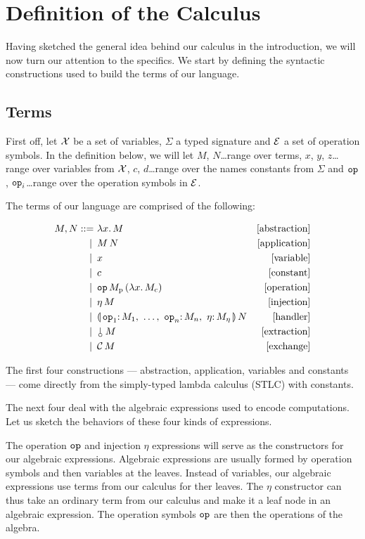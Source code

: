 \documentclass{llncs}
\begin{document}
\section{Definition of the Calculus}
\label{sec:definition}

Having sketched the general idea behind our calculus in the introduction,
we will now turn our attention to the specifics. We start by defining the
syntactic constructions used to build the terms of our language.

\subsection{Terms}
\label{ssec:terms}

First off, let $\mathcal{X}$ be a set of variables, $\Sigma$ a typed signature and
$\mathcal{E}$ a set of operation symbols. In the definition below, we will let $M$,
$N$\ldots range over terms, $x$, $y$, $z$\ldots range over variables from
$\mathcal{X}$, $c$, $d$\ldots range over the names constants from $\Sigma$ and
$\mathtt{op}$, $\mathtt{op}_i$\ldots range over the operation symbols in $\mathcal{E}$.

The terms of our language are comprised of the following:

\begin{align*}
  M, N ::= &\ \lam{x}{M} & \mbox{[abstraction]} \\
   | \, &\ \ap{M}{N} & \mbox{[application]} \\
   | \, &\ x & \mbox{[variable]} \\
   | \, &\ c & \mbox{[constant]} \\
   | \, &\ \app{\op{op}}{M_{\mathrm{p}}}{(\lam{x}{M_{\mathrm{c}}})} & \mbox{[operation]} \\
   | \, &\ \ap{\eta}{M} & \mbox{[injection]} \\
   | \, &\ \ap{\cdbanana}{N} & \mbox{[handler]} \\
   | \, &\ \ap{\cherry}{M} & \mbox{[extraction]} \\
   | \, &\ \ap{\CC}{M} & \mbox{[exchange]} 
\end{align*}

The first four constructions --- abstraction, application, variables and
constants --- come directly from the simply-typed lambda calculus (STLC)
with constants.

The next four deal with the algebraic expressions used to encode
computations. Let us sketch the behaviors of these four kinds of
expressions.

The operation $\mathtt{op}$ and injection $\eta$ expressions will serve as the
constructors for our algebraic expressions. Algebraic expressions are
usually formed by operation symbols and then variables at the
leaves. Instead of variables, our algebraic expressions use terms from our
calculus for ther leaves. The $\eta$ constructor can thus take an ordinary
term from our calculus and make it a leaf node in an algebraic
expression. The operation symbols $\mathtt{op}$ are then the operations of the
algebra.
\end{document}

